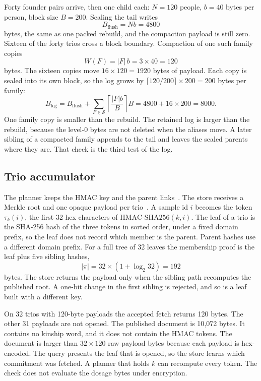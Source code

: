 \documentclass[11pt]{article}
\begin{document}
Forty founder pairs arrive, then one child each: \(N = 120\) people, \(b = 40\) bytes per person, block size \(B = 200\).
Sealing the tail writes
\[
B_{\mathrm{flush}} = N b = 4800
\]
bytes, the same as one packed rebuild, and the compaction payload is still zero.
Sixteen of the forty trios cross a block boundary.
Compaction of one such family copies
\begin{equation}
W(F) = |F| \, b = 3 \times 40 = 120
\label{eq:family-copy}
\end{equation}
bytes.
The sixteen copies move \(16 \times 120 = 1920\) bytes of payload.
Each copy is sealed into its own block, so the log grows by \(\lceil 120 / 200 \rceil \times 200 = 200\) bytes per family:
\begin{equation}
B_{\mathrm{log}}
  = B_{\mathrm{flush}}
  + \sum_{F \in \mathcal{S}} \left\lceil \frac{|F| b}{B} \right\rceil B
  = 4800 + 16 \times 200
  = 8000.
\label{eq:lsm-log}
\end{equation}
One family copy is smaller than the rebuild.
The retained log is larger than the rebuild, because the level-0 bytes are not deleted when the aliases move.
A later sibling of a compacted family appends to the tail and leaves the sealed parents where they are.
That check is the third test of the log.

\subsection{Trio accumulator}
\label{sec:accum}

The planner keeps the HMAC key and the parent links~\cite{rfc2104}.
The store receives a Merkle root and one opaque payload per trio~\cite{merkle1987}.
A sample id \(i\) becomes the token \(\tau_k(i)\), the first 32 hex characters of \(\mathrm{HMAC}\text{-SHA256}(k, i)\).
The leaf of a trio is the SHA-256 hash of the three tokens in sorted order, under a fixed domain prefix, so the leaf does not record which member is the parent.
Parent hashes use a different domain prefix.
For a full tree of 32 leaves the membership proof is the leaf plus five sibling hashes,
\begin{equation}
|\pi| = 32 \times (1 + \log_2 32) = 192
\label{eq:proof}
\end{equation}
bytes.
The store returns the payload only when the sibling path recomputes the published root.
A one-bit change in the first sibling is rejected, and so is a leaf built with a different key.

On 32 trios with 120-byte payloads the accepted fetch returns 120 bytes.
The other 31 payloads are not opened.
The published document is 10{,}072 bytes.
It contains no kinship word, and it does not contain the HMAC tokens.
The document is larger than \(32 \times 120\) raw payload bytes because each payload is hex-encoded.
The query presents the leaf that is opened, so the store learns which commitment was fetched.
A planner that holds \(k\) can recompute every token.
The check does not evaluate the dosage bytes under encryption.
\end{document}
